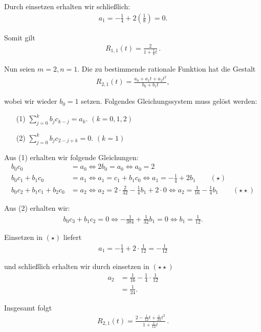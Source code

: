 \documentclass[a4paper]{article}
\begin{document}
    Durch einsetzen erhalten wir schließlich:
    \begin{align*}
      a_1 = -\frac{1}{4} + 2\left(\frac{1}{8}\right) = 0.
    \end{align*}

    Somit gilt 
    \begin{align*}
      R_{1,1}(t) = \frac{2}{1+\frac{1}{8}t}\,.
    \end{align*}

    Nun seien $m=2, n=1$. Die zu bestimmende rationale Funktion hat die Gestalt
    \begin{align*}
      R_{2,1}(t) = \frac{a_0 + a_1t + a_2t^2}{b_0 + b_1t},
    \end{align*}

    wobei wir wieder $b_0 = 1$ setzen. Folgendes Gleichungssystem muss gelöst werden:
    \begin{enumerate}
      \item[(1)] $\sum_{j=0}^{k} b_j c_{k-j} = a_k$. \quad $(k = 0,1,2)$
      \item[(2)] $\sum_{j=0}^{k} b_j c_{2-j+k} = 0$. \quad $(k = 1)$
    \end{enumerate}

    Aus (1) erhalten wir folgende Gleichungen:
    \begin{align*}
      b_0c_0 &= a_0 \iff 2b_0 = a_0 \iff a_0 = 2   \\
      b_0c_1 + b_1c_0 &= a_1 \iff a_1 = c_1 + b_1c_0 \iff a_1 = -\frac{1}{4} + 2b_1 \qquad (\star) \\
      b_0c_2 + b_1c_1 + b_2c_0 &= a_2 \iff a_2 = 2\cdot \frac{2}{32} - \frac{1}{4}b_1 + 2\cdot 0
                                      \iff a_2 = \frac{1}{16} - \frac{1}{4}b_1 \qquad (\star\star)
    \end{align*}

    Aus (2) erhalten wir:
    \begin{align*}
      b_0c_3 + b_1c_2 = 0 \iff -\frac{1}{384} + \frac{1}{32}b_1 = 0 \iff b_1 = \frac{1}{12}.
    \end{align*}

    Einsetzen in $(\star)$ liefert 
    \begin{align*}
      a_1 = -\frac{1}{4} + 2\cdot \frac{1}{12} = -\frac{1}{12}
    \end{align*}

    und schließlich erhalten wir durch einsetzen in $(\star\star)$
    \begin{align*}
      a_2 &= \frac{1}{16} - \frac{1}{4}\cdot \frac{1}{12}  \\
          &= \frac{1}{24}.
    \end{align*}

    Insgesamt folgt
    \begin{align*}
      R_{2,1}(t) = \frac{2 - \frac{1}{12}t + \frac{1}{24}t^2}{1 + \frac{1}{12}t}\,.
    \end{align*}
\end{document}
